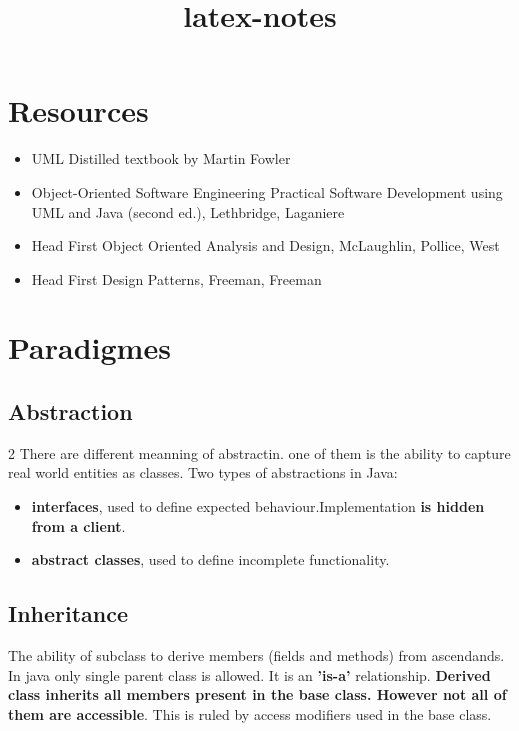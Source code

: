 \documentclass{report}
\title{latex-notes}
\begin{document}
\tableofcontents





\part{Resources}

\begin{itemize}
	\item UML Distilled textbook by Martin Fowler 
	\item Object-Oriented Software Engineering Practical Software Development
	using UML and Java (second ed.), Lethbridge, Laganiere
	\item Head First Object Oriented Analysis and Design, McLaughlin, Pollice, West
	\item Head First Design Patterns, Freeman, Freeman 
\end{itemize}




\part{Paradigmes}



\chapter{Abstraction}2
There are different meanning of abstractin. one of them is the ability to capture real world entities as classes.
Two types of abstractions in Java:
\begin{itemize}
	\item \textbf{interfaces}, used to define expected behaviour.Implementation \textbf{is hidden from a client}.
	\item \textbf{abstract classes}, used to define incomplete functionality.
\end{itemize}



\chapter{Inheritance}
The ability of subclass to derive members (fields and methods) from ascendands. In java only single parent class is allowed. It is an \textbf{'is-a'} relationship.
\textbf{Derived class inherits all members present in the base class. 
However not all of them are accessible}. This is ruled by access modifiers used in the base class.
\end{document}
